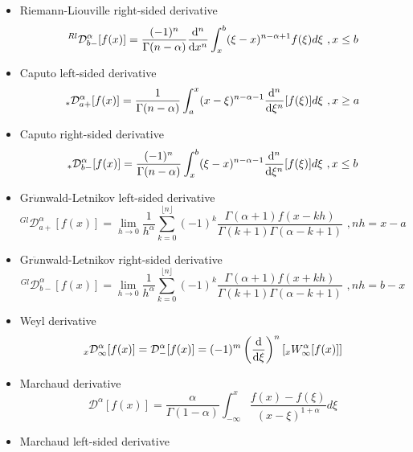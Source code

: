 \documentclass[twoside]{book}
\begin{document}
{\begin{itemize}
    \item Riemann-Liouville right-sided derivative
          \begin{equation}
              ^{Rl}\mathcal{D}^{\alpha}_{b-}[f(x)] = \frac{(-1)^n}{\Gamma{(n-\alpha)}} \dv[n]{}{x} \int_x^b (\xi-x)^{n-\alpha+1} f(\xi) d\xi  \,\, ,   x \leq b
          \end{equation}
    \item Caputo left-sided derivative
          \begin{equation}
              _{*}\mathcal{D}^{\alpha}_{a+}[f(x)] = \frac{1}{\Gamma{(n-\alpha)}} \int_a^x (x-\xi)^{n-\alpha-1} \dv[n]{}{\xi}[f(\xi)] d\xi  \,\, , x \geq a
          \end{equation}
    \item Caputo right-sided derivative
          \begin{equation}
              _{*}\mathcal{D}^{\alpha}_{b-}[f(x)] = \frac{(-1)^n}{\Gamma{(n-\alpha)}} \int_x^b (\xi-x)^{n-\alpha-1} \dv[n]{}{\xi}[f(\xi)] d\xi  \,\, , x \leq b
          \end{equation}
    \item Gr$\ddot{u}$nwald-Letnikov left-sided derivative
          \begin{equation}
              ^{Gl}\mathcal{D}^{\alpha}_{a+}[f(x)] = \lim_{h\to 0} \frac{1}{h^\alpha} \sum_{k=0}^{\lfloor n \rfloor} (-1)^k \frac{\Gamma{(\alpha+1) f(x-kh)}}{\Gamma{(k+1)} \Gamma{(\alpha-k+1)}} \,\, , nh=x-a
          \end{equation}
    \item Gr$\ddot{u}$nwald-Letnikov right-sided derivative
          \begin{equation}
              ^{Gl}\mathcal{D}^{\alpha}_{b-}[f(x)] = \lim_{h\to 0} \frac{1}{h^\alpha} \sum_{k=0}^{\lfloor n \rfloor} (-1)^k \frac{\Gamma{(\alpha+1) f(x+kh)}}{\Gamma{(k+1)} \Gamma{(\alpha-k+1)}} \,\, , nh=b-x
          \end{equation}
    \item Weyl derivative
          \begin{equation}
              _{x}\mathcal{D}^{\alpha}_{\infty}[f(x)] = \mathcal{D}^{\alpha}_{-}[f(x)] = (-1)^m \left(\dv{}{\xi}\right)^n \left[_{x}W^{\alpha}_{\infty}[f(x)]\right]
          \end{equation}
    \item Marchaud derivative
          \begin{equation}
              \mathcal{D}^{\alpha}[f(x)]=\frac{\alpha}{\Gamma{(1-\alpha)}} \int_{-\infty}^x \frac{f(x)-f(\xi)}{(x-\xi)^{1+\alpha}} d\xi
          \end{equation}
    \item Marchaud left-sided derivative


\end{itemize}}
\end{document}
